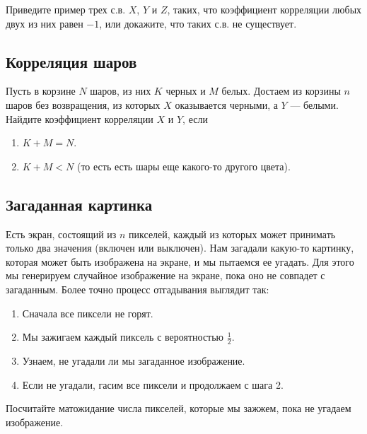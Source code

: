 \documentclass[12pt]{article}
\begin{document}
Приведите пример трех с.в. $X$, $Y$ и $Z$, таких, что коэффициент корреляции любых двух из них равен $-1$, или докажите, что таких с.в. не существует.

\subsection{Корреляция шаров}

Пусть в корзине $N$ шаров, из них $K$ черных и $M$ белых. Достаем из корзины $n$ шаров без возвращения, из которых $X$ оказывается черными, а $Y$ --- белыми. Найдите коэффициент корреляции $X$ и $Y$, если 
\begin{enumerate}
    \item $K + M = N$.
    \item $K +M < N$ (то есть есть шары еще какого-то другого цвета).
\end{enumerate}

\subsection{Загаданная картинка}

Есть экран, состоящий из $n$ пикселей, каждый из которых может принимать только два значения (включен или выключен). Нам загадали какую-то картинку, которая может быть изображена на экране, и мы пытаемся ее угадать. Для этого мы генерируем случайное изображение на экране, пока оно не совпадет с загаданным. Более точно процесс отгадывания выглядит так:
\begin{enumerate}
    \item Сначала все пиксели не горят.
    \item Мы зажигаем каждый пиксель с вероятностью $\frac{1}{2}$.
    \item Узнаем, не угадали ли мы загаданное изображение.
    \item Если не угадали, гасим все пиксели и продолжаем с шага 2.
\end{enumerate}
Посчитайте матожидание числа пикселей, которые мы зажжем, пока не угадаем изображение. 
\end{document}
